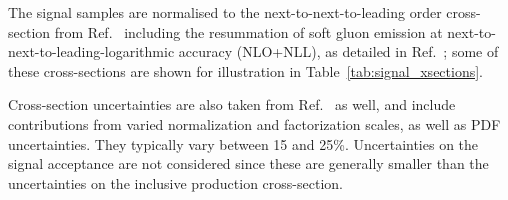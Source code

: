 The signal samples are normalised to the next-to-next-to-leading order cross-section from Ref.~\cite{twiki-SusyCrossSections} 
including the resummation of soft gluon emission at next-to-next-to-leading-logarithmic accuracy (NLO+NLL), 
as detailed in Ref.~\cite{Borschensky:2014cia}; 
some of these cross-sections are shown for illustration in Table~\ref{tab:signal_xsections}. 

Cross-section uncertainties are also taken from Ref.~\cite{twiki-SusyCrossSections} as well, 
and include contributions from varied normalization and factorization scales, as well as PDF uncertainties. 
They typically vary between 15 and 25\%. 
Uncertainties on the signal acceptance are not considered since 
 these are generally smaller than the uncertainties on the inclusive production cross-section. 

